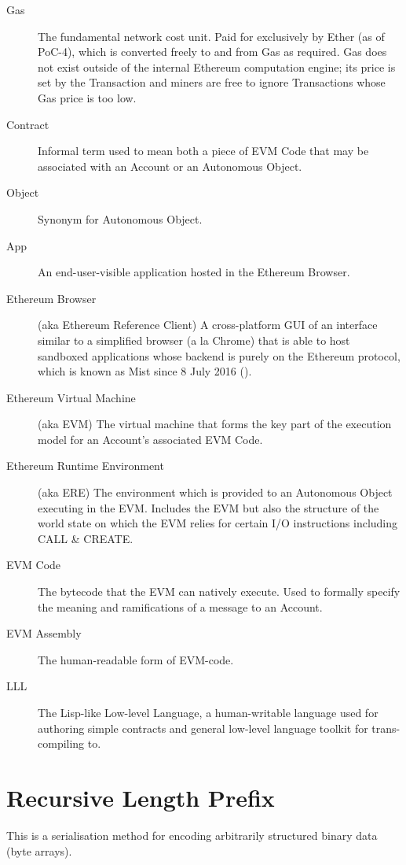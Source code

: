 \documentclass[9pt,oneside]{amsart}
\begin{document}
\begin{description}
\item[Gas] The fundamental network cost unit. Paid for exclusively by Ether (as of PoC-4), which is converted freely to and from Gas as required. Gas does not exist outside of the internal Ethereum computation engine; its price is set by the Transaction and miners are free to ignore Transactions whose Gas price is too low.

\item[Contract] Informal term used to mean both a piece of EVM Code that may be associated with an Account or an Autonomous Object.

\item[Object] Synonym for Autonomous Object.

\item[App] An end-user-visible application hosted in the Ethereum Browser.

\item[Ethereum Browser] (aka Ethereum Reference Client) A cross-platform GUI of an interface similar to a simplified browser (a la Chrome) that is able to host sandboxed applications whose backend is purely on the Ethereum protocol, which is known as Mist since 8 July 2016 (\cite{Mist}).

\item[Ethereum Virtual Machine] (aka EVM) The virtual machine that forms the key part of the execution model for an Account's associated EVM Code.

\item[Ethereum Runtime Environment] (aka ERE) The environment which is provided to an Autonomous Object executing in the EVM. Includes the EVM but also the structure of the world state on which the EVM relies for certain I/O instructions including CALL \& CREATE.

\item[EVM Code] The bytecode that the EVM can natively execute. Used to formally specify the meaning and ramifications of a message to an Account.

\item[EVM Assembly] The human-readable form of EVM-code.

\item[LLL] The Lisp-like Low-level Language, a human-writable language used for authoring simple contracts and general low-level language toolkit for trans-compiling to.

\end{description}

\hypertarget{rlp}{}
\section{Recursive Length Prefix}\label{app:rlp}
This is a serialisation method for encoding arbitrarily structured binary data (byte arrays).
\end{document}
